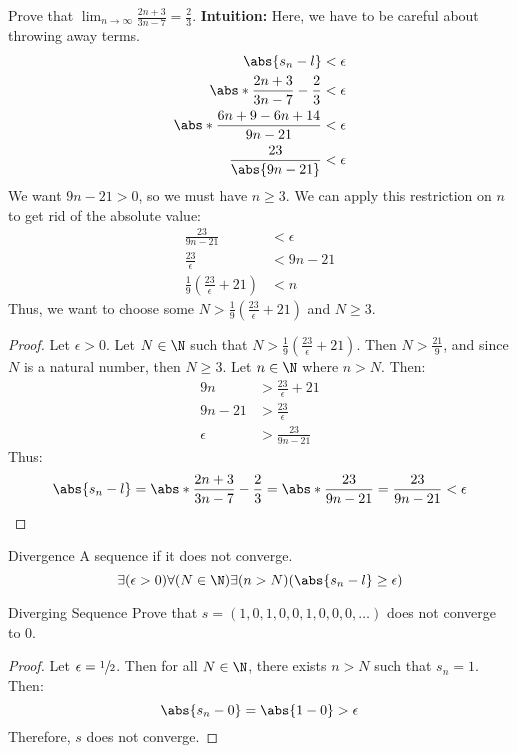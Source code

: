 \begin{exbox}{}{}
    Prove that $\lim_{n \to \infty} \frac{2n+3}{3n-7} = \frac{2}{3}$.
    \tcblower
    \textbf{Intuition:} Here, we have to be careful about throwing away terms.
    \begin{align*}
        \abs{s_n - l} &< \epsilon \\
        \abs*{\frac{2n+3}{3n-7} - \frac{2}{3}} &< \epsilon \\
        \abs*{\frac{6n+9-6n+14}{9n-21}} &< \epsilon \\
        \frac{23}{\abs{9n-21}} &< \epsilon
    \end{align*}
    We want $9n-21 > 0$, so we must have $n \geq 3$. We can apply this restriction on $n$ to get rid of the absolute value:
    \begin{align*}
        \frac{23}{9n-21} &< \epsilon \\
        \frac{23}{\epsilon} &< 9n - 21 \\
        \frac{1}{9} \left( \frac{23}{\epsilon} + 21 \right) &< n
    \end{align*}
    Thus, we want to choose some $N > \frac{1}{9} \left( \frac{23}{\epsilon} + 21 \right) $ and $N \geq 3$.
    \begin{proof}
        Let $\epsilon > 0$. Let $N \in \N$ such that $N > \frac{1}{9} \left( \frac{23}{\epsilon} + 21 \right)$. Then $N > \frac{21}{9}$, and since $N$ is a natural number, then $N \geq 3$. Let $n \in \N$ where $n > N$. Then:
        \begin{align*}
            9n &> \frac{23}{\epsilon} + 21 \\
            9n - 21 &> \frac{23}{\epsilon} \\
            \epsilon &> \frac{23}{9n - 21}
        \end{align*}
        Thus:
        \[ \abs{s_n - l} = \abs*{\frac{2n+3}{3n-7} - \frac{2}{3}} = \abs*{\frac{23}{9n-21}} = \frac{23}{9n-21} < \epsilon \]

    \end{proof}
\end{exbox}

\begin{dfnbox}{Divergence}{}
    A sequence  if it does not converge.
    \tcblower
    \[ \exists(\epsilon > 0) \forall(N \in \N) \exists(n > N) (\abs{s_n -l} \geq \epsilon) \]
\end{dfnbox}

\begin{exbox}{Diverging Sequence}{}
    Prove that $s = (1,0,1,0,0,1,0,0,0,\ldots)$ does not converge to $0$.
    \tcblower
    \begin{proof}
        Let $\epsilon = \sfrac{1}{2}$. Then for all $N \in \N$, there exists $n > N$ such that $s_n = 1$. Then:
        \[ \abs{s_n - 0} = \abs{1-0} > \epsilon \]
        Therefore, $s$ does not converge.
    \end{proof}
\end{exbox}

